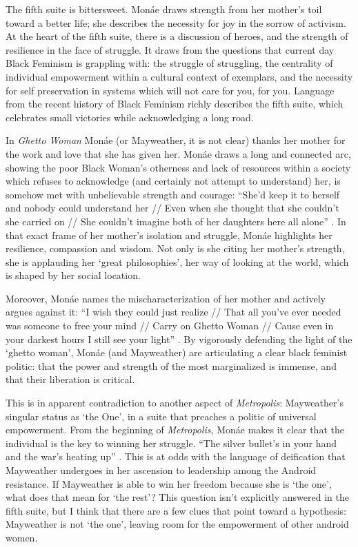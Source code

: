 \documentclass[a4paper, 11pt]{article} %
\begin{document}
The fifth suite is bittersweet.
Mon\'ae draws strength from her mother's toil toward a better life; she describes the necessity for joy in the sorrow of activism.
At the heart of the fifth suite, there is a discussion of heroes, and the strength of resilience in the face of struggle.
It draws from the questions that current day Black Feminism is grappling with: the struggle of struggling, the centrality of individual empowerment within a cultural context of exemplars, and the necessity for self preservation in systems which will not care for you, for you.
Language from the recent history of Black Feminism richly describes the fifth suite, which celebrates small victories while acknowledging a long road.

In \emph{Ghetto Woman} Mon\'ae (or Mayweather, it is not clear) thanks her mother for the work and love that she has given her.
Mon\'ae draws a long and connected arc, showing the poor Black Woman's otherness and lack of resources within a society which refuses to acknowledge (and certainly not attempt to understand) her, is somehow met with unbelievable strength and courage:
``She'd keep it to herself and nobody could understand her // Even when she thought that she couldn't she carried on // She couldn't imagine both of her daughters here all alone'' \cite{ghettowoman}.
In that exact frame of her mother's isolation and struggle, Mon\'ae highlights her resilience, compassion and wisdom.
Not only is she citing her mother's strength, she is applauding her `great philosophies', her way of looking at the world, which is shaped by her social location.

Moreover, Mon\'ae names the mischaracterization of her mother and actively argues against it:
``I wish they could just realize // That all you've ever needed was someone to free your mind // Carry on Ghetto Woman // Cause even in your darkest hours I still see your light'' \cite{ghettowoman}.
By vigorously defending the light of the `ghetto woman', Mon\'ae (and Mayweather) are articulating a clear black feminist politic: that the power and strength of the most marginalized is immense, and that their liberation is critical. 

This is in apparent contradiction to another aspect of \emph{Metropolis}: Mayweather's singular status as `the One', in a suite that preaches a politic of universal empowerment.
From the beginning of \emph{Metropolis}, Mon\'ae makes it clear that the individual is the key to winning her struggle.
``The silver bullet's in your hand and the war's heating up'' \cite{manymoons}.
This is at odds with the language of deification that Mayweather undergoes in her ascension to leadership among the Android resistance.
 If Mayweather is able to win her freedom because she is `the one', what does that mean for `the rest'?
This question isn't explicitly answered in the fifth suite, but I think that there are a few clues that point toward a hypothesis: Mayweather is not `the one', leaving room for the empowerment of other android women.
\end{document}
